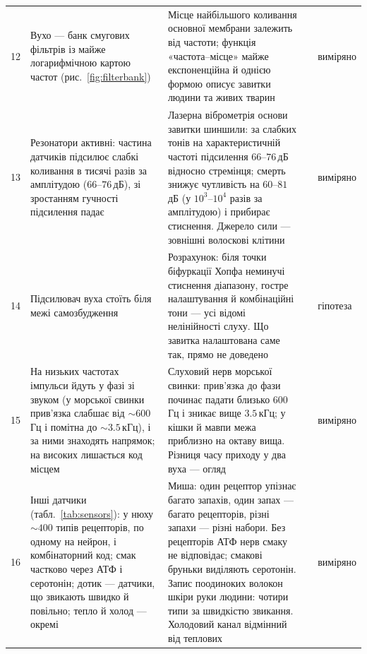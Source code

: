 {\begin{longtable}{>{\raggedright}p{0.5cm}>{\raggedright}p{4.0cm}>{\raggedright}p{5.6cm}>{\raggedright}p{2.3cm}>{\raggedright\arraybackslash}p{1.7cm}}
12 & Вухо --- банк смугових фільтрів із майже логарифмічною картою частот (рис.~\ref{fig:filterbank}) & Місце найбільшого коливання основної мембрани залежить від частоти; функція «частота--місце» майже експоненційна й однією формою описує завитки людини та живих тварин & \cite{Greenwood1990,Robles2001} & виміряно \\
13 & Резонатори активні: частина датчиків підсилює слабкі коливання в тисячі разів за амплітудою ($66$--$76$\,дБ), зі зростанням гучності підсилення падає & Лазерна віброметрія основи завитки шиншили: за слабких тонів на характеристичній частоті підсилення $66$--$76$\,дБ відносно стремінця; смерть знижує чутливість на $60$--$81$\,дБ (у $10^3$--$10^4$ разів за амплітудою) і прибирає стиснення. Джерело сили --- зовнішні волоскові клітини & \cite{Ruggero1997,Robles2001} & виміряно \\
14 & Підсилювач вуха стоїть біля межі самозбудження & Розрахунок: біля точки біфуркації Хопфа неминучі стиснення діапазону, гостре налаштування й комбінаційні тони --- усі відомі нелінійності слуху. Що завитка налаштована саме так, прямо не доведено & \cite{Eguiluz2000} & гіпотеза \\
15 & На низьких частотах імпульси йдуть у фазі зі звуком (у морської свинки прив'язка слабшає від $\sim600$\,Гц і помітна до $\sim3.5$\,кГц), і за ними знаходять напрямок; на високих лишається код місцем & Слуховий нерв морської свинки: прив'язка до фази починає падати близько $600$\,Гц і зникає вище $3.5$\,кГц; у кішки й мавпи межа приблизно на октаву вища. Різниця часу приходу у два вуха --- огляд & \cite{PalmerRussell1986,Grothe2010} & виміряно \\
16 & Інші датчики (табл.~\ref{tab:sensors}): у нюху $\sim400$ типів рецепторів, по одному на нейрон, і комбінаторний код; смак частково через АТФ і серотонін; дотик --- датчики, що звикають швидко й повільно; тепло й холод --- окремі & Миша: один рецептор упізнає багато запахів, один запах --- багато рецепторів, різні запахи --- різні набори. Без рецепторів АТФ нерв смаку не відповідає; смакові бруньки виділяють серотонін. Запис поодиноких волокон шкіри руки людини: чотири типи за швидкістю звикання. Холодовий канал відмінний від теплових & \cite{Mombaerts2004,Malnic1999,Finger2005,Huang2005,JohanssonVallbo1979,McKemy2002} & виміряно \\
\bottomrule
\end{longtable}}
